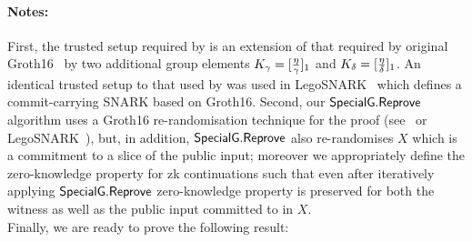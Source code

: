 \noindent \paragraph{Notes:} First, the trusted setup required by \specg is 
an extension of that required by original Groth16~\cite{Groth16} by two additional 
group elements $K_{\gamma} = [\frac{\eta}{\gamma}]_1$ and $K_{\delta} = [\frac{\eta}{\delta}]_1$. 
An identical trusted setup to that used by \specg was used in LegoSNARK~\cite[Fig.~22]{LegoSNARK} which defines 
a commit-carrying SNARK based on Groth16. Second, our ${\mathsf{SpecialG}}.{\mathsf{Reprove}}$ algorithm uses a Groth16 re-randomisation 
technique for the proof (see~\cite[Fig.~1]{RandomizationGroth16} or LegoSNARK~\cite[Fig.~22]{LegoSNARK}), 
but, in addition, ${\mathsf{SpecialG}}.{\mathsf{Reprove}}$ also re-randomises $X$ which is a commitment to a slice of the public input; moreover 
we appropriately define the zero-knowledge property for zk continuations such that even after iteratively applying 
${\mathsf{SpecialG}}.{\mathsf{Reprove}}$ zero-knowledge property is preserved for both the witness as well as the public input committed to in $X$.  \\


\noindent Finally, we are ready to prove the following result:

